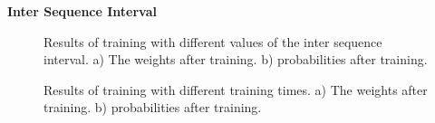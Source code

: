 \documentclass[10pt,a4paper]{article}
\begin{document}
\textbf{Inter Sequence Interval}

\begin{figure}[H]
    \centering
    \qquad
    \caption{Results of training with different values of the inter sequence interval. a) The weights after training. b) probabilities after training.}
    \label{fig:off_line_learning_ISI}%
\end{figure}

\begin{figure}[H]
    \centering
    \qquad
    \caption{Results of training with different training times. a) The weights after training. b) probabilities after training.}
    \label{fig:off_line_learning_ISI2}%
\end{figure}
\end{document}
